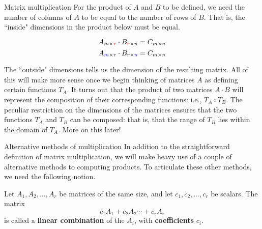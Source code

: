 \begin{frame}{Matrix multiplication}
For the product of $A$ and $B$ to be defined, we need the number of columns of $A$ to be equal to the number of rows of $B$. That is, the ``inside" dimensions in the product below must be equal.
\begin{overprint}
\[
A_{m\times\color{red} r}\cdot B_{{\color{red}{r}}\times n}=C_{m\times n}
\]
\[
A_{{\color{blue}m}\times r}\cdot B_{r\times {\color{blue}n}}=C_{m\times n}
\]
\end{overprint}
\bpause The ``outside" dimensions tells us the dimension of the resulting matrix. 
\bpause All of this will make more sense once we begin thinking of matrices $A$ as defining certain functions $T_A$. It turns out that the product of two matrices $A\cdot B$ will represent the \alert{composition} of their corresponding functions: i.e., $T_A\circ T_B$. 
\bpause The peculiar restriction on the dimensions of the matrices ensures that the two functions $T_A$ and $T_B$ can be composed: that is, that the range of $T_B$ lies within the domain of $T_A$.  More on this later!
\end{frame}
\begin{frame}{Alternative methods of multiplication}
In addition to the straightforward definition of matrix multiplication, we will make \alert{heavy use} of a couple of alternative methods to computing products. 
\bpause To articulate these other methods, we need the following notion. 
\begin{definition}
Let $A_1,A_2,\dots, A_r$ be matrices of the same size, and let $c_1,c_2, \dots ,c_r$ be scalars. The matrix 
\[
c_1A_1+c_2A_2\cdots +c_rA_r
\]
is called a {\bf linear combination} of the $A_i$, with {\bf coefficients} $c_i$. 
\end{definition}
\end{frame}
